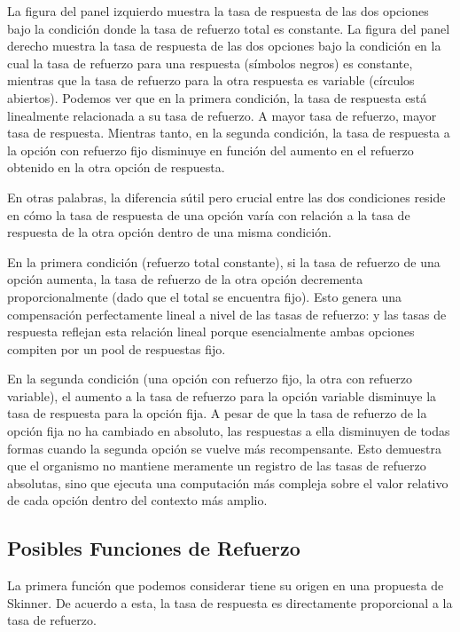 \documentclass[
  a4paper,
  DIV=11,
  numbers=noendperiod]{scrreprt}
\begin{document}
La figura del panel izquierdo muestra la tasa de respuesta de las dos
opciones bajo la condición donde la tasa de refuerzo total es constante.
La figura del panel derecho muestra la tasa de respuesta de las dos
opciones bajo la condición en la cual la tasa de refuerzo para una
respuesta (símbolos negros) es constante, mientras que la tasa de
refuerzo para la otra respuesta es variable (círculos abiertos). Podemos
ver que en la primera condición, la tasa de respuesta está linealmente
relacionada a su tasa de refuerzo. A mayor tasa de refuerzo, mayor tasa
de respuesta. Mientras tanto, en la segunda condición, la tasa de
respuesta a la opción con refuerzo fijo disminuye en función del aumento
en el refuerzo obtenido en la otra opción de respuesta.

En otras palabras, la diferencia sútil pero crucial entre las dos
condiciones reside en cómo la tasa de respuesta de una opción varía con
relación a la tasa de respuesta de la otra opción dentro de una misma
condición.

En la primera condición (refuerzo total constante), si la tasa de
refuerzo de una opción aumenta, la tasa de refuerzo de la otra opción
decrementa proporcionalmente (dado que el total se encuentra fijo). Esto
genera una compensación perfectamente lineal a nivel de las tasas de
refuerzo: y las tasas de respuesta reflejan esta relación lineal porque
esencialmente ambas opciones compiten por un pool de respuestas fijo.

En la segunda condición (una opción con refuerzo fijo, la otra con
refuerzo variable), el aumento a la tasa de refuerzo para la opción
variable disminuye la tasa de respuesta para la opción fija. A pesar de
que la tasa de refuerzo de la opción fija no ha cambiado en absoluto,
las respuestas a ella disminuyen de todas formas cuando la segunda
opción se vuelve más recompensante. Esto demuestra que el organismo no
mantiene meramente un registro de las tasas de refuerzo absolutas, sino
que ejecuta una computación más compleja sobre el valor relativo de cada
opción dentro del contexto más amplio.

\subsection{Posibles Funciones de
Refuerzo}\label{posibles-funciones-de-refuerzo}

La primera función que podemos considerar tiene su origen en una
propuesta de Skinner. De acuerdo a esta, la tasa de respuesta es
directamente proporcional a la tasa de refuerzo.
\end{document}

